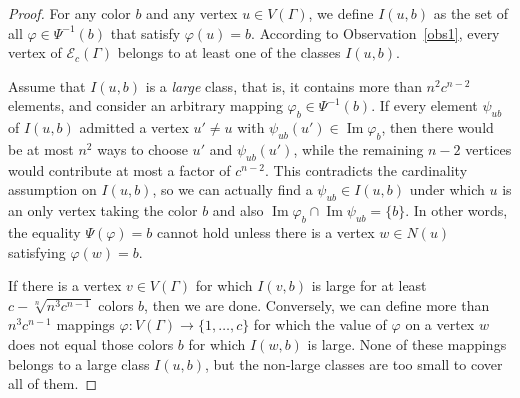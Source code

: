 \documentclass{amsart}
\theoremstyle{definition}
\theoremstyle{remark}
\numberwithin{equation}{section}
\def\E{\mathcal{E}}
\def\E{\mathcal{E}}
\begin{document}
\begin{proof}
For any color $b$ and any vertex $u\in V(\Gamma)$, we define $I(u,b)$ as the set of all $\varphi\in \Psi^{-1}(b)$ that satisfy $\varphi(u)=b$. According to Observation~\ref{obs1}, every vertex of $\E_c(\Gamma)$ belongs to at least one of the classes $I(u,b)$.

Assume that $I(u,b)$ is a \textit{large} class, that is, it contains more than $n^2c^{n-2}$ elements, and consider an arbitrary mapping $\varphi_b\in\Psi^{-1}(b)$. If every element $\psi_{ub}$ of $I(u,b)$ admitted a vertex $u'\neq u$ with $\psi_{ub}(u')\in\operatorname{Im}\varphi_b$, then there would be at most $n^2$ ways to choose $u'$ and $\psi_{ub}(u')$, while the remaining $n-2$ vertices would contribute at most a factor of $c^{n-2}$. This contradicts the cardinality assumption on $I(u,b)$, so we can actually find a $\psi_{ub}\in I(u,b)$ under which $u$ is an only vertex taking the color $b$ and also $\operatorname{Im}\varphi_b\cap\operatorname{Im}\psi_{ub}=\{b\}$. In other words, the equality $\Psi(\varphi)=b$ cannot hold unless there is a vertex $w\in N(u)$ satisfying $\varphi(w)=b$.



If there is a vertex $v\in V(\Gamma)$ for which $I(v,b)$ is large for at least $c-\sqrt[n]{n^3c^{n-1}}$ colors $b$, then we are done. Conversely, we can define more than $n^3c^{n-1}$ mappings $\varphi: V(\Gamma)\to\{1,\ldots,c\}$ for which the value of $\varphi$ on a vertex $w$ does not equal those colors $b$ for which $I(w,b)$ is large. None of these mappings belongs to a large class $I(u,b)$, but the non-large classes are too small to cover all of them.
\end{proof}
\end{document}
